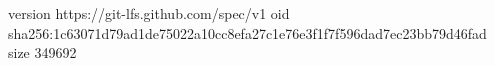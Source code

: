 version https://git-lfs.github.com/spec/v1
oid sha256:1c63071d79ad1de75022a10cc8efa27c1e76e3f1f7f596dad7ec23bb79d46fad
size 349692
